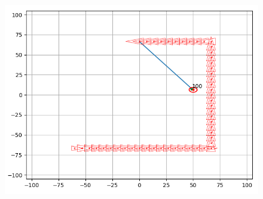 \documentclass[11pt]{article}
\begin{document}
    
\begin{figure}
\centering
\includegraphics{3.png}
\end{figure}
    
\end{document}
